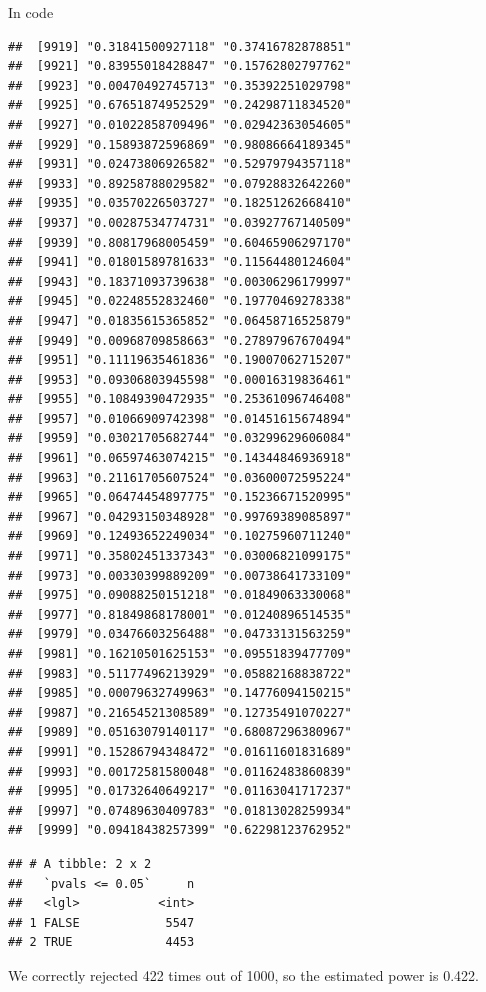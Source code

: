 \documentclass[ignorenonframetext,]{beamer}
\newenvironment{Shaded}{\begin{snugshade}}{\end{snugshade}}
\newcommand{\FloatTok}[1]{\textcolor[rgb]{0.00,0.00,0.81}{#1}}
\newcommand{\KeywordTok}[1]{\textcolor[rgb]{0.13,0.29,0.53}{\textbf{#1}}}
\newcommand{\NormalTok}[1]{#1}
\newcommand{\OperatorTok}[1]{\textcolor[rgb]{0.81,0.36,0.00}{\textbf{#1}}}
\newcommand{\StringTok}[1]{\textcolor[rgb]{0.31,0.60,0.02}{#1}}
\begin{document}
\begin{frame}[fragile]{In code}
\begin{verbatim}
##  [9919] "0.31841500927118" "0.37416782878851"
##  [9921] "0.83955018428847" "0.15762802797762"
##  [9923] "0.00470492745713" "0.35392251029798"
##  [9925] "0.67651874952529" "0.24298711834520"
##  [9927] "0.01022858709496" "0.02942363054605"
##  [9929] "0.15893872596869" "0.98086664189345"
##  [9931] "0.02473806926582" "0.52979794357118"
##  [9933] "0.89258788029582" "0.07928832642260"
##  [9935] "0.03570226503727" "0.18251262668410"
##  [9937] "0.00287534774731" "0.03927767140509"
##  [9939] "0.80817968005459" "0.60465906297170"
##  [9941] "0.01801589781633" "0.11564480124604"
##  [9943] "0.18371093739638" "0.00306296179997"
##  [9945] "0.02248552832460" "0.19770469278338"
##  [9947] "0.01835615365852" "0.06458716525879"
##  [9949] "0.00968709858663" "0.27897967670494"
##  [9951] "0.11119635461836" "0.19007062715207"
##  [9953] "0.09306803945598" "0.00016319836461"
##  [9955] "0.10849390472935" "0.25361096746408"
##  [9957] "0.01066909742398" "0.01451615674894"
##  [9959] "0.03021705682744" "0.03299629606084"
##  [9961] "0.06597463074215" "0.14344846936918"
##  [9963] "0.21161705607524" "0.03600072595224"
##  [9965] "0.06474454897775" "0.15236671520995"
##  [9967] "0.04293150348928" "0.99769389085897"
##  [9969] "0.12493652249034" "0.10275960711240"
##  [9971] "0.35802451337343" "0.03006821099175"
##  [9973] "0.00330399889209" "0.00738641733109"
##  [9975] "0.09088250151218" "0.01849063330068"
##  [9977] "0.81849868178001" "0.01240896514535"
##  [9979] "0.03476603256488" "0.04733131563259"
##  [9981] "0.16210501625153" "0.09551839477709"
##  [9983] "0.51177496213929" "0.05882168838722"
##  [9985] "0.00079632749963" "0.14776094150215"
##  [9987] "0.21654521308589" "0.12735491070227"
##  [9989] "0.05163079140117" "0.68087296380967"
##  [9991] "0.15286794348472" "0.01611601831689"
##  [9993] "0.00172581580048" "0.01162483860839"
##  [9995] "0.01732640649217" "0.01163041717237"
##  [9997] "0.07489630409783" "0.01813028259934"
##  [9999] "0.09418438257399" "0.62298123762952"
\end{verbatim}

\begin{Shaded}
\end{Shaded}

\begin{verbatim}
## # A tibble: 2 x 2
##   `pvals <= 0.05`     n
##   <lgl>           <int>
## 1 FALSE            5547
## 2 TRUE             4453
\end{verbatim}

We correctly rejected 422 times out of 1000, so the estimated power is
0.422.

\end{frame}
\end{document}
